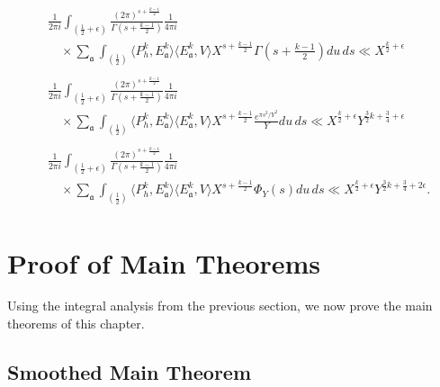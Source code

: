 \begin{align}
  \begin{split}
    &\frac{1}{2\pi i} \int_{(\frac{1}{2} + \epsilon)} \frac{(2\pi)^{s +
    \frac{k-1}{2}}}{\Gamma(s + \frac{k-1}{2})} \frac{1}{4\pi i} \\
    &\quad \times \sum_{\mathfrak{a}} \int_{(\frac{1}{2})} \langle P_h^k,
    E_\mathfrak{a}^k\rangle \langle
    E_\mathfrak{a}^k, V\rangle X^{s+\frac{k-1}{2}} \Gamma(s + \tfrac{k-1}{2}) du \, ds \ll
    X^{\frac{k}{2} + \epsilon} \label{eq:hyperboloid:continuous_gamma_integral_bound}
  \end{split}
  \\
  \begin{split}
    &\frac{1}{2\pi i} \int_{(\frac{1}{2} + \epsilon)} \frac{(2\pi)^{s +
    \frac{k-1}{2}}}{\Gamma(s + \frac{k-1}{2})} \frac{1}{4\pi i} \\
    &\quad \times \sum_{\mathfrak{a}}
    \int_{(\frac{1}{2})} \langle P_h^k, E_\mathfrak{a}^k\rangle \langle E_\mathfrak{a}^k,
    V\rangle X^{s+\frac{k-1}{2}} \frac{e^{\pi s^2 / Y^2}}{Y} du\, ds \ll X^{\frac{k}{2} +
    \epsilon} Y^{\frac{3}{2}k + \frac{3}{4} + \epsilon}
    \label{eq:hyperboloid:continuous_concentrating_integral_bound}
  \end{split}
  \\
  \begin{split}
    &\frac{1}{2\pi i} \int_{(\frac{1}{2} + \epsilon)} \frac{(2\pi)^{s +
    \frac{k-1}{2}}}{\Gamma(s + \frac{k-1}{2})} \frac{1}{4\pi i} \\
    &\quad \times \sum_{\mathfrak{a}}
    \int_{(\frac{1}{2})} \langle P_h^k, E_\mathfrak{a}^k\rangle \langle E_\mathfrak{a}^k,
    V\rangle X^{s+\frac{k-1}{2}} \Phi_Y(s) du \, ds \ll X^{\frac{k}{2} + \epsilon}
    Y^{\frac{3}{2}k + \frac{3}{4} + 2\epsilon}.
    \label{eq:hyperboloid:continuous_compact_integral_bound}
  \end{split}
\end{align}



\section{Proof of Main Theorems}\label{sec:hyp:proof_main_theorems}


Using the integral analysis from the previous section, we now prove the main theorems of
this chapter.


\subsection{Smoothed Main Theorem}


